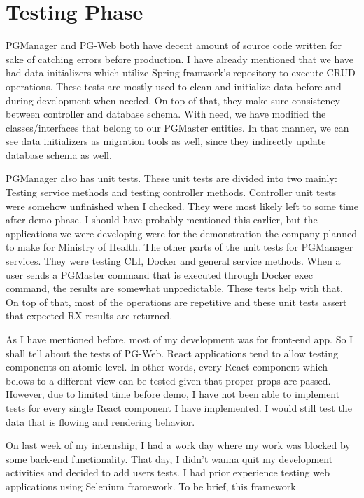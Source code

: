 \section{Testing Phase}
PGManager and PG-Web both have decent amount of source code written for sake 
of catching errors before production. I have already mentioned that we have 
had data initializers which utilize Spring framwork's repository to execute 
CRUD operations. These tests are mostly used to clean and initialize data 
before and during development when needed. On top of that, they make sure 
consistency between controller and database schema. With need, we have 
modified the classes/interfaces that belong to our PGMaster entities. In that 
manner, we can see data initializers as migration tools as well, since they 
indirectly update database schema as well.
\par
PGManager also has unit tests. These unit tests are divided into two mainly: 
Testing service methods and testing controller methods. Controller unit tests 
were somehow unfinished when I checked. They were most likely left to some 
time after demo phase. I should have probably mentioned this earlier, but the 
applications we were developing were for the demonstration the company planned 
to make for Ministry of Health. The other parts of the unit tests for PGManager 
services. They were testing CLI, Docker and general service methods. When a 
user sends a PGMaster command that is executed through Docker exec command, 
the results are somewhat unpredictable. These tests help with that. On top of 
that, most of the operations are repetitive and these unit tests assert that 
expected RX results are returned.
\par
As I have mentioned before, most of my development was for front-end app. So I 
shall tell about the tests of PG-Web. React applications tend to allow testing 
components on atomic level. In other words, every React component which belows 
to a different view can be tested given that proper props are passed. However, 
due to limited time before demo, I have not been able to implement tests for 
every single React component I have implemented. I would still test the data 
that is flowing and rendering behavior.
\par
On last week of my internship, I had a work day where my work was blocked by 
some back-end functionality. That day, I didn't wanna quit my development 
activities and decided to add users tests. I had prior experience testing 
web applications using Selenium framework. To be brief, this framework 
